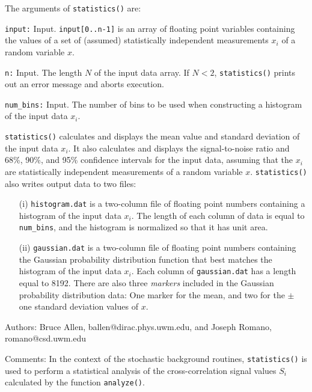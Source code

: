 The arguments of {\tt statistics()} are:
\begin{description}
%
\item{\tt input:} Input. 
{\tt input[0..n-1]} is an array of floating point variables containing 
the values of a set of (assumed) statistically independent measurements 
$x_i$ of a random variable $x$.
%
\item{\tt n:} Input.  
The length $N$ of the input data array.
If $N<2$, {\tt statistics()} prints out an error message and aborts 
execution.
%
\item{\tt num\_bins:} Input.
The number of bins to be used when constructing a histogram of the 
input data $x_i$.
\end{description}

{\tt statistics()} calculates and displays the mean 
value and standard deviation of the input data $x_i$.
It also calculates and displays the signal-to-noise ratio and 68\%, 90\%, 
and 95\% confidence intervals for the input data, assuming that the
$x_i$ are statistically independent measurements of a random variable $x$.
{\tt statistics()} also writes output data to two files:
%
\begin{itemize}
\item[(i)]
{\tt histogram.dat} is a two-column file of floating point numbers
containing a histogram of the input data $x_i$.
The length of each column of data is equal to {\tt num\_bins}, and
the histogram is normalized so that it has unit area. 
\item[(ii)]
{\tt gaussian.dat} is a two-column file of floating point numbers
containing the Gaussian probability distribution function that best
matches the histogram of the input data $x_i$.
Each column of {\tt gaussian.dat} has a length equal to 8192.
There are also three {\it markers} included in the Gaussian 
probability distribution data: 
One marker for the mean, and two for the $\pm$ one standard deviation
values of $x$.
\end{itemize}
%
\begin{description}
\item{Authors:}
Bruce Allen, ballen@dirac.phys.uwm.edu, and Joseph Romano, romano@csd.uwm.edu
\item{Comments:}
In the context of the stochastic background routines, 
{\tt statistics()} is used to perform a statistical analysis of 
the cross-correlation signal values $S_i$ calculated by the
function {\tt analyze()}.
\end{description}
\clearpage

